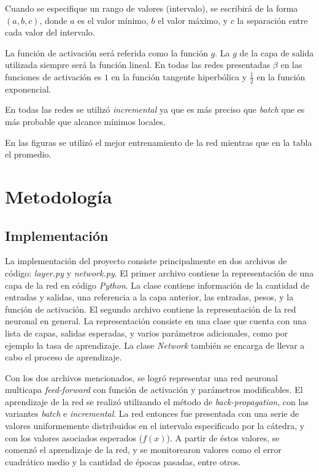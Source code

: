\documentclass[12pt,a4paper]{article}
\begin{document}
Cuando se especifique un rango de valores (intervalo), se escribirá de la forma $(a, b, c)$, donde $a$ es el valor mínimo, $b$ el valor máximo, y $c$ la separación entre cada valor del intervalo.

La función de activación será referida como la función $g$.  La $g$ de la capa de salida utilizada siempre será la función lineal. En todas las redes presentadas $\beta$ en las funciones de activación es $1$ en la función tangente hiperbólica y $\frac{1}{2}$ en la función exponencial.

En todas las redes se utilizó \emph{incremental} ya que es más preciso que \emph{batch} que es más probable que alcance mínimos locales.

En las figuras se utilizó el mejor entrenamiento de la red mientras que en la tabla el promedio.

\section{Metodología}	
\subsection{Implementación}

La implementación del proyecto consiste principalmente en dos archivos de código: \emph{layer.py} y \emph{network.py}.  El primer archivo contiene la representación de una capa de la red en código \emph{Python}.  La clase contiene información de la cantidad de entradas y salidas, una referencia a la capa anterior, las entradas, pesos, y la función de activación.  El segundo archivo contiene la representación de la red neuronal en general.  La representación consiste en una clase que cuenta con una lista de capas, salidas esperadas, y varios parámetros adicionales, como por ejemplo la tasa de aprendizaje.  La clase \emph{Network} también se encarga de llevar a cabo el proceso de aprendizaje.

Con los dos archivos mencionados, se logró representar una red neuronal multicapa \emph{feed-forward} con función de activación y parámetros modificables.  El aprendizaje de la red se realizó utilizando el método de \emph{back-propagation}, con las variantes \emph{batch} e \emph{incremental}.  La red entonces fue presentada con una serie de valores uniformemente distribuidos en el intervalo especificado por la cátedra, y con los valores asociados esperados ($f(x)$).  A partir de éstos valores, se comenzó el aprendizaje de la red, y se monitorearon valores como el error cuadrático medio y la cantidad de épocas pasadas, entre otros.
\end{document}
